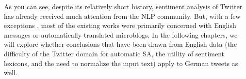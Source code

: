
As you can see, despite its relatively short history, sentiment
analysis of Twitter has already received much attention from the NLP
community.  But, with a few exceptions
\cite[\eg{}][]{Basile:13,Araque:15,Cesteros:15}, most of the existing
works were primarily concerned with English messages or automatically
translated microblogs.  In the following chapters, we will explore
whether conclusions that have been drawn from English data (the
difficulty of the Twitter domain for automatic SA, the utility of
sentiment lexicons, and the need to normalize the input text) apply to
German tweets as well.



